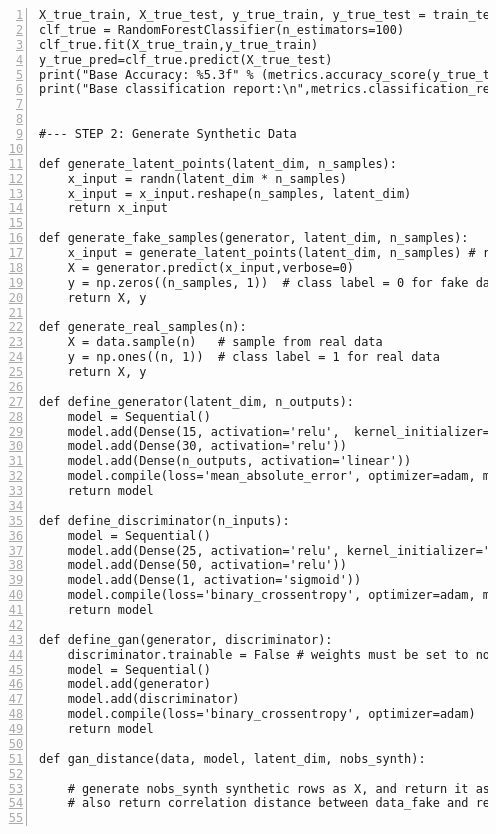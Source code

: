 \documentclass[oneside,10pt]{book}
\begin{document}
\begin{lstlisting}[numbers=left]
X_true_train, X_true_test, y_true_train, y_true_test = train_test_split(X, y, test_size=0.30, random_state=42)
clf_true = RandomForestClassifier(n_estimators=100)
clf_true.fit(X_true_train,y_true_train)
y_true_pred=clf_true.predict(X_true_test)
print("Base Accuracy: %5.3f" % (metrics.accuracy_score(y_true_test, y_true_pred)))
print("Base classification report:\n",metrics.classification_report(y_true_test, y_true_pred))


#--- STEP 2: Generate Synthetic Data

def generate_latent_points(latent_dim, n_samples):
    x_input = randn(latent_dim * n_samples) 
    x_input = x_input.reshape(n_samples, latent_dim)
    return x_input

def generate_fake_samples(generator, latent_dim, n_samples):
    x_input = generate_latent_points(latent_dim, n_samples) # random N(0,1) data
    X = generator.predict(x_input,verbose=0) 
    y = np.zeros((n_samples, 1))  # class label = 0 for fake data
    return X, y

def generate_real_samples(n):
    X = data.sample(n)   # sample from real data
    y = np.ones((n, 1))  # class label = 1 for real data
    return X, y

def define_generator(latent_dim, n_outputs): 
    model = Sequential()
    model.add(Dense(15, activation='relu',  kernel_initializer='he_uniform', input_dim=latent_dim))
    model.add(Dense(30, activation='relu'))
    model.add(Dense(n_outputs, activation='linear'))
    model.compile(loss='mean_absolute_error', optimizer=adam, metrics=['mean_absolute_error']) # 
    return model

def define_discriminator(n_inputs):
    model = Sequential()
    model.add(Dense(25, activation='relu', kernel_initializer='he_uniform', input_dim=n_inputs))
    model.add(Dense(50, activation='relu'))
    model.add(Dense(1, activation='sigmoid'))
    model.compile(loss='binary_crossentropy', optimizer=adam, metrics=['accuracy']) 
    return model

def define_gan(generator, discriminator):
    discriminator.trainable = False # weights must be set to not trainable
    model = Sequential()
    model.add(generator) 
    model.add(discriminator) 
    model.compile(loss='binary_crossentropy', optimizer=adam)  
    return model

def gan_distance(data, model, latent_dim, nobs_synth): 

    # generate nobs_synth synthetic rows as X, and return it as data_fake
    # also return correlation distance between data_fake and real data


\end{lstlisting}
\end{document}
